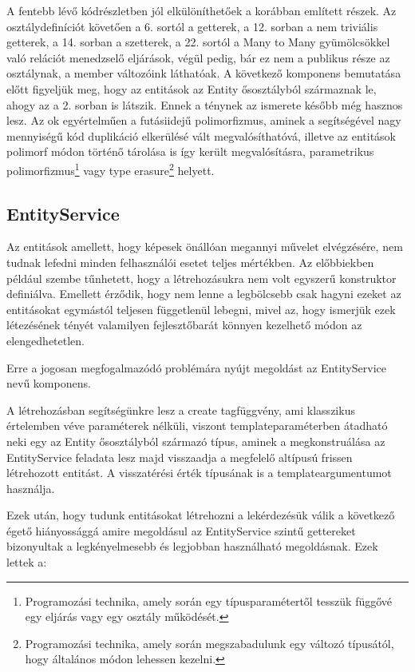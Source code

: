 A fentebb lévő kódrészletben jól elkülöníthetőek a korábban említett részek. Az osztálydefiníciót követően a 6. sortól a getterek, a 12. sorban a nem triviális getterek, a 14. sorban a szetterek, a 22. sortól a Many to Many gyümölcsökkel való relációt menedzselő eljárások, végül pedig, bár ez nem a publikus része az osztálynak, a member változóink láthatóak.
A következő komponens bemutatása előtt figyeljük meg, hogy az entitások az Entity ősosztályból származnak le, ahogy az a 2. sorban is látszik. Ennek a ténynek az ismerete később még hasznos lesz. Az ok egyértelműen a futásiidejű polimorfizmus, aminek a segítségével nagy mennyiségű kód duplikáció elkerülésé vált megvalósíthatóvá, illetve az entitások polimorf módon történő tárolása is így került megvalósításra, parametrikus polimorfizmus\footnote{Programozási technika, amely során egy típusparamétertől tesszük függővé egy eljárás vagy egy osztály működését.} vagy type erasure\footnote{Programozási technika, amely során megszabadulunk egy változó típusától, hogy általános módon lehessen kezelni.} helyett.

\subsection{EntityService}

Az entitások amellett, hogy képesek önállóan megannyi művelet elvégzésére, nem tudnak lefedni minden felhasználói esetet teljes mértékben. Az előbbiekben például szembe tűnhetett, hogy a létrehozásukra nem volt egyszerű konstruktor definiálva. Emellett érződik, hogy nem lenne a legbölcsebb csak hagyni ezeket az entitásokat egymástól teljesen függetlenül lebegni, mivel az, hogy ismerjük ezek létezésének tényét valamilyen fejlesztőbarát könnyen kezelhető módon az elengedhetetlen.

Erre a jogosan megfogalmazódó problémára nyújt megoldást az EntityService nevű komponens.

A létrehozásban segítségünkre lesz a create tagfüggvény, ami klasszikus értelemben véve paraméterek nélküli, viszont templateparaméterben átadható neki egy az Entity ősosztályból származó típus, aminek a megkonstruálása az EntityService feladata lesz majd visszaadja a megfelelő altípusú frissen létrehozott entitást. A visszatérési érték típusának is a templateargumentumot használja.

Ezek után, hogy tudunk entitásokat létrehozni a lekérdezésük válik a következő égető hiányossággá amire megoldásul az EntityService szintű gettereket bizonyultak a legkényelmesebb és legjobban használható megoldásnak. Ezek lettek a:

